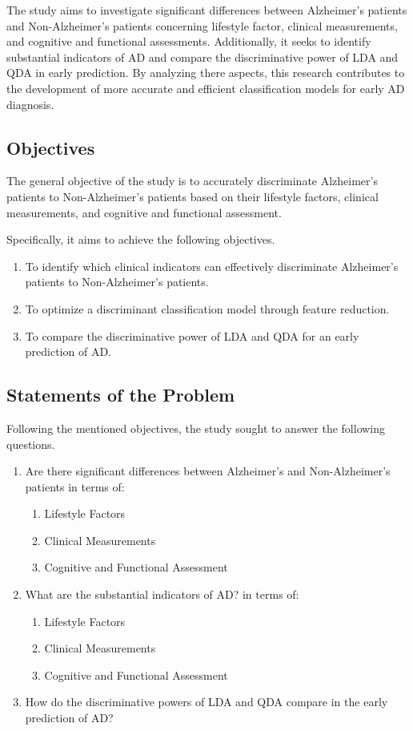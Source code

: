 \documentclass[12pt]{article}
\begin{document}
The study aims to investigate significant differences between Alzheimer's patients and Non-Alzheimer's patients concerning lifestyle factor, clinical measurements, and cognitive and functional assessments. Additionally, it seeks to identify 
substantial indicators of AD and compare the discriminative power of LDA and QDA in early prediction. By analyzing there aspects, this research contributes to the development of more accurate and efficient classification models for early AD 
diagnosis. 

\subsection{Objectives}
\noindent

The general objective of the study is to accurately discriminate Alzheimer's patients to Non-Alzheimer's patients based on their lifestyle factors, clinical measurements, and cognitive and functional assessment.

Specifically, it aims to achieve the following objectives. 

\begin{enumerate}
    \item To identify which clinical indicators can effectively discriminate Alzheimer's patients to Non-Alzheimer's patients. 
    \item To optimize a discriminant classification model through feature reduction. 
    \item To compare the discriminative power of LDA and QDA for an early prediction of AD. 
\end{enumerate}

\subsection{Statements of the Problem}
\noindent

Following the mentioned objectives, the study sought to answer the following questions. 
\begin{enumerate}
    \item Are there significant differences between Alzheimer's and Non-Alzheimer's patients in terms of:
    \begin{enumerate}
        \item Lifestyle Factors
        \item Clinical Measurements
        \item Cognitive and Functional Assessment
    \end{enumerate}
    \item What are the substantial indicators of AD? in terms of: 
    \begin{enumerate}
        \item Lifestyle Factors
        \item Clinical Measurements
        \item Cognitive and Functional Assessment
    \end{enumerate}
    \item How do the discriminative powers of LDA and QDA compare in the early prediction of AD?
\end{enumerate}
\end{document}
